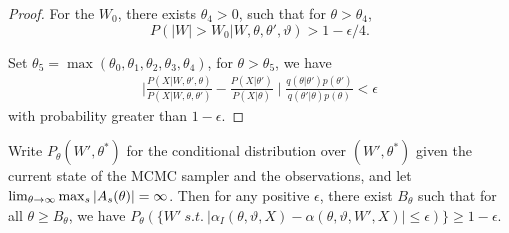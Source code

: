 \begin{proof}
For the $W_0$, there exists $\theta_4 > 0$, such that for $\theta > \theta_4$, $$P(|W| > W_0 | W, \theta, \theta', \vartheta) > 1- \epsilon / 4.$$


Set $\theta_5 = \max(\theta_0, \theta_1,\theta_2, \theta_3, \theta_4)$, for $\theta > \theta_5$, we have 
\begin{align*}
\mid \frac{P(X | W, \theta' , \theta)}{P(X | W, \theta , \theta')} - \frac{P(X | \theta')}{P(X | \theta)} \mid \frac{q(\theta | \theta')p(\theta')}{q(\theta' | \theta)p(\theta)} < \epsilon
\end{align*}
with probability greater than $1 - \epsilon$.


\end{proof}
\begin{proposition}
  Write $P_{\theta}(W',\theta^*)$ for the conditional distribution 
  over $(W',\theta^*)$ given the current state of the MCMC sampler and the 
  observations, and let
  $\lim_{\theta\rightarrow\infty} {\max_s |A_s(\theta)|} = \infty$. Then for any positive 
  $\epsilon$, there exist $B_\theta$ such that for all 
  $\theta \ge B_\theta$, %
  we have 
  $P_{\theta}(\{W'\ s.t.\ |\alpha_I(\theta,\vartheta,X) - \alpha(\theta,\vartheta,W',X)| 
  \le \epsilon)\} \ge 1-\epsilon$.%
\label{prop:mix}
\end{proposition}
